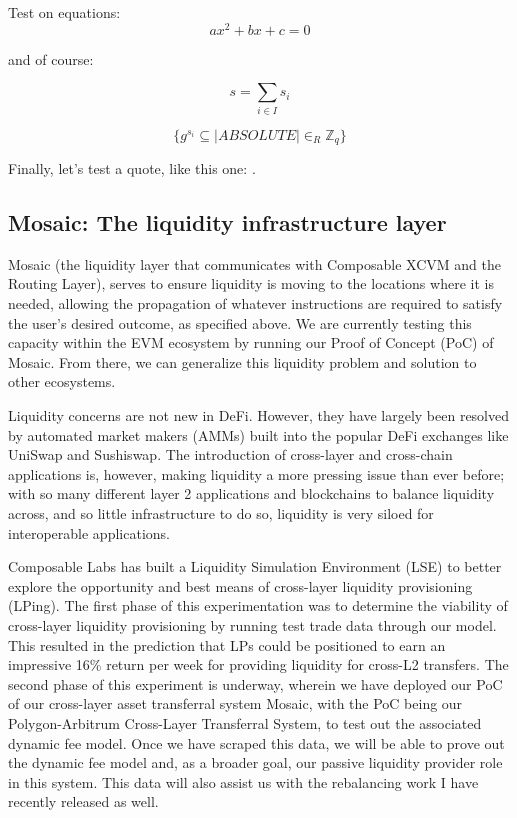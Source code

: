Test on equations:
\[ax^2 + bx + c = 0\]

and of course:

\begin{equation}
    s = \sum_{i\in I} s_i
\end{equation}

\begin{equation*}
    \{g^{s_i} \subseteq |ABSOLUTE| \in_R \mathbb{Z}_q\}
\end{equation*}

Finally, let's test a quote, like this one: \cite{gennaro2018fast}.

\subsection{Mosaic: The liquidity infrastructure layer}

Mosaic (the liquidity layer that communicates with Composable XCVM and the Routing Layer), serves to ensure liquidity is moving to the locations where it is needed, allowing the propagation of whatever instructions are required to satisfy the user’s desired outcome, as specified above. We are currently testing this capacity within the EVM ecosystem by running our Proof of Concept (PoC) of Mosaic. From there, we can generalize this liquidity problem and solution to other ecosystems.

Liquidity concerns are not new in DeFi. However, they have largely been resolved by automated market makers (AMMs) built into the popular DeFi exchanges like UniSwap and Sushiswap. The introduction of cross-layer and cross-chain applications is, however, making liquidity a more pressing issue than ever before; with so many different layer 2 applications and blockchains to balance liquidity across, and so little infrastructure to do so, liquidity is very siloed for interoperable applications.

Composable Labs has built a Liquidity Simulation Environment (LSE) to better explore the opportunity and best means of cross-layer liquidity provisioning (LPing). The first phase of this experimentation was to determine the viability of cross-layer liquidity provisioning by running test trade data through our model. This resulted in the prediction that LPs could be positioned to earn an impressive 16\% return per week for providing liquidity for cross-L2 transfers. The second phase of this experiment is underway, wherein we have deployed our PoC of our cross-layer asset transferral system Mosaic, with the PoC being our Polygon-Arbitrum Cross-Layer Transferral System, to test out the associated dynamic fee model. Once we have scraped this data, we will be able to prove out the dynamic fee model and, as a broader goal, our passive liquidity provider role in this system. This data will also assist us with the rebalancing work I have recently released as well.

